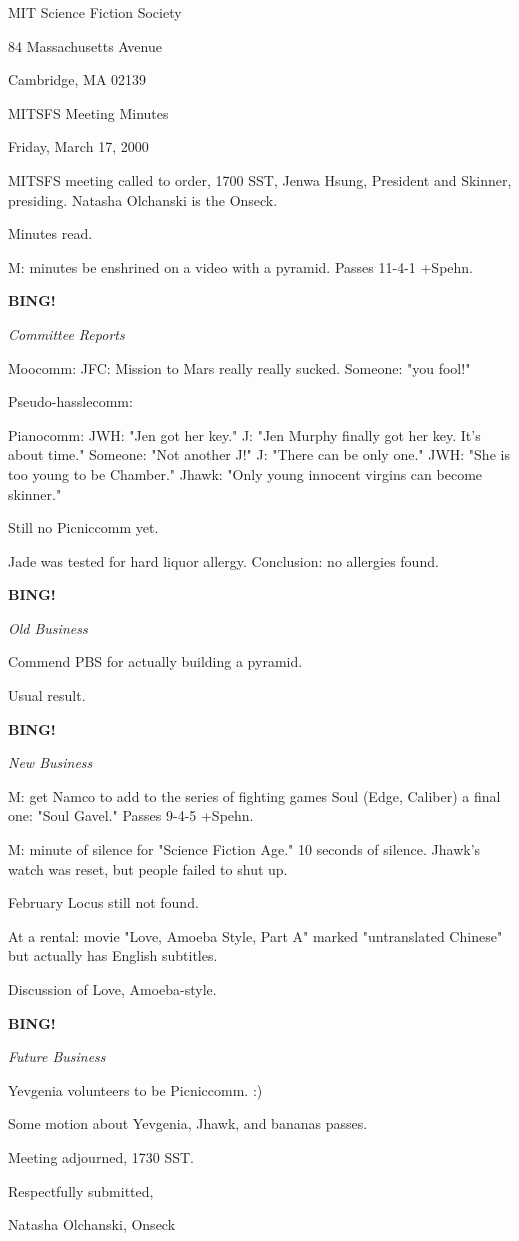 \documentclass[12pt]{article}
\newcommand{\bing}{{\bf BING!} }
\newcommand{\goto}[1]{\bing \vskip 12pt \centerline{{\em{#1}}}}
\begin{document}
\begin{center}

MIT Science Fiction Society 

84 Massachusetts Avenue

Cambridge, MA 02139

\vspace{12pt}

MITSFS Meeting Minutes 

Friday, March 17, 2000

\end{center}
 
\vspace{18pt}

\setlength{\parskip}{6pt}

\noindent
MITSFS meeting called to order, 1700 SST, Jenwa Hsung, President and
Skinner, presiding.  Natasha Olchanski is the Onseck.

Minutes read.

M: minutes be enshrined on a video with a pyramid. Passes 11-4-1 +Spehn.

\goto{Committee Reports}

Moocomm: JFC: Mission to Mars really really sucked. Someone: "you fool!"

Pseudo-hasslecomm:

Pianocomm: JWH: "Jen got her key." J: "Jen Murphy finally got her key. It's about time." Someone: "Not another J!" J: "There can be only one." JWH: "She is too young to be Chamber." Jhawk: "Only young innocent virgins can become skinner."

Still no Picniccomm yet.

Jade was tested for hard liquor allergy. Conclusion: no allergies found.

\goto{Old Business}

Commend PBS for actually building a pyramid.

Usual result.

\goto{New Business}

M: get Namco to add to the series of fighting games Soul (Edge, Caliber) a final one: "Soul Gavel." Passes 9-4-5 +Spehn.

M: minute of silence for "Science Fiction Age." 10 seconds of silence. Jhawk's watch was reset, but people failed to shut up.

February Locus still not found.

At a rental: movie "Love, Amoeba Style, Part A" marked "untranslated Chinese" but actually has English subtitles.

Discussion of Love, Amoeba-style.

\goto{Future Business}

Yevgenia volunteers to be Picniccomm. :)

Some motion about Yevgenia, Jhawk, and bananas passes.

\vspace{12pt}

\noindent
Meeting adjourned, 1730 SST.

\vspace{18pt}

\centerline{Respectfully submitted,}
\centerline{Natasha Olchanski, Onseck}
\end{document}
